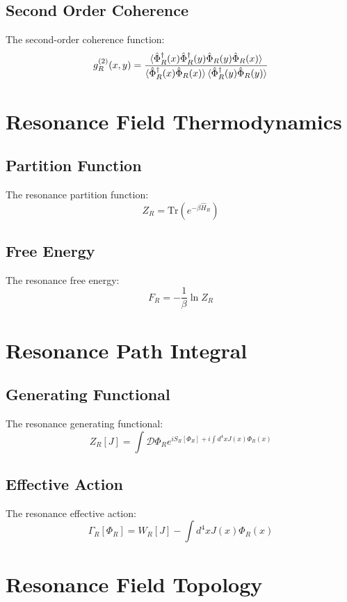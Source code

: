 \documentclass[12pt]{article}
\begin{document}
\subsection{Second Order Coherence}
The second-order coherence function:
\begin{equation}
g_R^{(2)}(x,y) = \frac{\braket{\hat{\Phi}_R^\dagger(x)\hat{\Phi}_R^\dagger(y)\hat{\Phi}_R(y)\hat{\Phi}_R(x)}}{\braket{\hat{\Phi}_R^\dagger(x)\hat{\Phi}_R(x)}\braket{\hat{\Phi}_R^\dagger(y)\hat{\Phi}_R(y)}}
\end{equation}
\section{Resonance Field Thermodynamics}
\subsection{Partition Function}
The resonance partition function:
\begin{equation}
Z_R = \text{Tr}(e^{-\beta\hat{H}_R})
\end{equation}
\subsection{Free Energy}
The resonance free energy:
\begin{equation}
F_R = -\frac{1}{\beta}\ln Z_R
\end{equation}
\section{Resonance Path Integral}
\subsection{Generating Functional}
The resonance generating functional:
\begin{equation}
Z_R[J] = \int \mathcal{D}\Phi_R e^{iS_R[\Phi_R] + i\int d^4x J(x)\Phi_R(x)}
\end{equation}
\subsection{Effective Action}
The resonance effective action:
\begin{equation}
\Gamma_R[\Phi_R] = W_R[J] - \int d^4x J(x)\Phi_R(x)
\end{equation}
\section{Resonance Field Topology}
\end{document}
